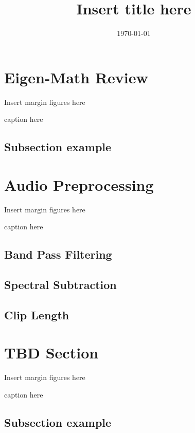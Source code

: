 \documentclass{tufte-handout}
\title{Insert title here}
\author{}
\date{\today}
\begin{document}
\maketitle

\vspace{0.1in}


\section{Eigen-Math Review}

\begin{marginfigure}
Insert margin figures here
\caption{caption here}
\end{marginfigure}

\subsection{Subsection example}



\section{Audio Preprocessing}

\begin{marginfigure}
Insert margin figures here
\caption{caption here}
\end{marginfigure}

\subsection{Band Pass Filtering}

\subsection{Spectral Subtraction}

\subsection{Clip Length}



\section{TBD Section}

\begin{marginfigure}
Insert margin figures here
\caption{caption here}
\end{marginfigure}

\subsection{Subsection example}
\end{document}
